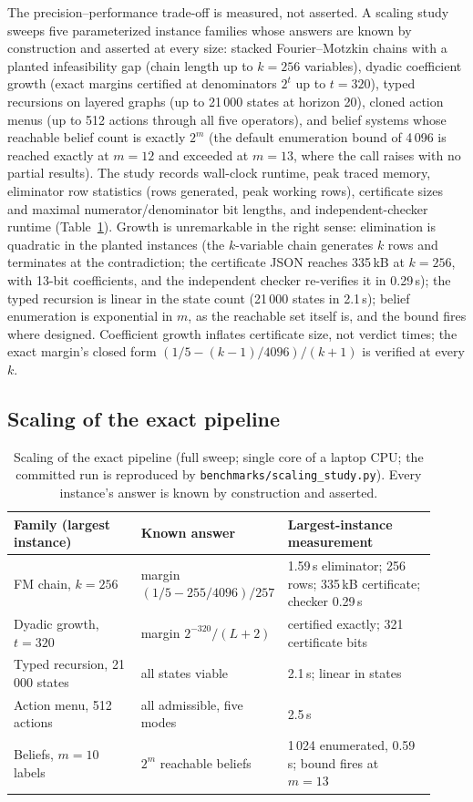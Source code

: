 \documentclass[3p,11pt]{elsarticle}
\begin{document}
The precision--performance trade-off is measured, not asserted. A scaling
study sweeps five parameterized instance families whose answers are known
by construction and asserted at every size: stacked Fourier--Motzkin
chains with a planted infeasibility gap (chain length up to $k = 256$
variables), dyadic coefficient growth (exact margins certified at
denominators $2^{t}$ up to $t = 320$), typed recursions on layered graphs
(up to 21\,000 states at horizon 20), cloned action menus (up to 512
actions through all five operators), and belief systems whose reachable
belief count is exactly $2^{m}$ (the default enumeration bound of 4\,096
is reached exactly at $m = 12$ and exceeded at $m = 13$, where the call
raises with no partial results). The study records wall-clock runtime,
peak traced memory, eliminator row statistics (rows generated, peak
working rows), certificate sizes and maximal numerator/denominator bit
lengths, and independent-checker runtime
(Table~\ref{tab:scaling}). Growth is unremarkable in the right sense:
elimination is quadratic in the planted instances (the $k$-variable chain
generates $k$ rows and terminates at the contradiction; the certificate
JSON reaches 335\,kB at $k = 256$, with 13-bit coefficients, and the
independent checker re-verifies it in 0.29\,s); the typed recursion is
linear in the state count (21\,000 states in 2.1\,s); belief enumeration
is exponential in $m$, as the reachable set itself is, and the bound
fires where designed. Coefficient growth inflates certificate size, not
verdict times; the exact margin's closed form
$(1/5 - (k-1)/4096)/(k+1)$ is verified at every $k$.

\subsection{Scaling of the exact pipeline}\label{sec:scaling}

\begin{table}[t]
\centering\footnotesize
\setlength{\tabcolsep}{3pt}
\begin{tabular}{@{}p{0.30\linewidth}p{0.27\linewidth}p{0.35\linewidth}@{}}
\toprule
Family (largest instance) & Known answer & Largest-instance measurement \\
\midrule
FM chain, $k = 256$ & margin $(1/5 - 255/4096)/257$ & 1.59\,s eliminator;
256 rows; 335\,kB certificate; checker 0.29\,s \\
Dyadic growth, $t = 320$ & margin $2^{-320}/(L+2)$ & certified exactly;
321 certificate bits \\
Typed recursion, 21\,000 states & all states viable & 2.1\,s; linear in
states \\
Action menu, 512 actions & all admissible, five modes & 2.5\,s \\
Beliefs, $m = 10$ labels & $2^{m}$ reachable beliefs & 1\,024 enumerated,
0.59\,s; bound fires at $m = 13$ \\
\bottomrule
\end{tabular}
\caption{Scaling of the exact pipeline (full sweep; single core of a
laptop CPU; the committed run is reproduced by
\texttt{benchmarks/scaling\_study.py}). Every instance's answer is known
by construction and asserted.}
\label{tab:scaling}
\end{table}
\end{document}
